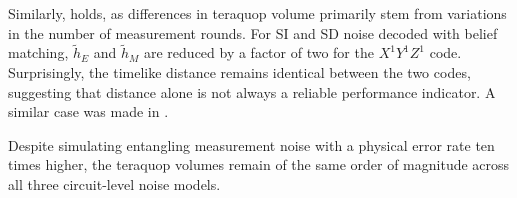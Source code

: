 Similarly,  holds, as differences in teraquop volume primarily stem from variations in the number of measurement rounds.
For SI and SD noise decoded with belief matching, $\tilde{h}_E$ and $\tilde{h}_M$ are reduced by a factor of two for the $X^1Y^1Z^1$ code.
Surprisingly, the timelike distance remains identical between the two codes, suggesting that distance alone is not always a reliable performance indicator.
A similar case was made in .

Despite simulating entangling measurement noise with a physical error rate ten times higher, the teraquop volumes remain of the same order of magnitude across all three circuit-level noise models.
